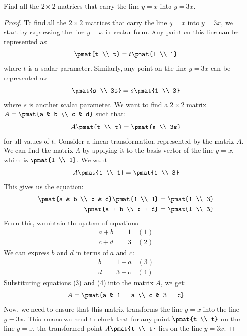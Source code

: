 \documentclass[openany]{book}
\begin{document}
\begin{exercise}
    Find all the $2 \times 2$ matrices that carry the line $y = x$ into $y = 3x$. 
\end{exercise}
\begin{proof}
To find all the $2 \times 2$ matrices that carry the line $y = x$ into $y = 3x$, we start by expressing the line $y = x$ in vector form. Any point on this line can be represented as:
$$\pmat{t \\ t} = t \pmat{1 \\ 1}$$
where $t$ is a scalar parameter. Similarly, any point on the line $y = 3x$ can be represented as:
$$\pmat{s \\ 3s} = s \pmat{1 \\ 3}$$
where $s$ is another scalar parameter. We want to find a $2 \times 2$ matrix $A = \pmat{a & b \\ c & d}$ such that:
$$A \pmat{t \\ t} = \pmat{s \\ 3s}$$
for all values of $t$. Consider a linear transformation represented by the matrix $A$. We can find the matrix $A$ by applying it to the basis vector of the line $y = x$, which is $\pmat{1 \\ 1}$. We want:
$$A \pmat{1 \\ 1} = \pmat{1 \\ 3}$$
This gives us the equation:
\[\begin{aligned}
\pmat{a & b \\ c & d} \pmat{1 \\ 1} &= \pmat{1 \\ 3} \\
\pmat{a + b \\ c + d} &= \pmat{1 \\ 3}
\end{aligned}\]
From this, we obtain the system of equations:
\[\begin{aligned}
a + b &= 1 \quad (1) \\
c + d &= 3 \quad (2)    
\end{aligned}\]
We can express $b$ and $d$ in terms of $a$ and $c$:
\[\begin{aligned}
b &= 1 - a \quad (3) \\
d &= 3 - c \quad (4)
\end{aligned}\]
Substituting equations (3) and (4) into the matrix $A$, we get:
$$A = \pmat{a & 1 - a \\ c & 3 - c}$$
Now, we need to ensure that this matrix transforms the line $y = x$ into the line $y = 3x$. This means we need to check that for any point $\pmat{t \\ t}$ on the line $y = x$, the transformed point $A \pmat{t \\ t}$ lies on the line $y = 3x$.

\end{proof}
\end{document}
